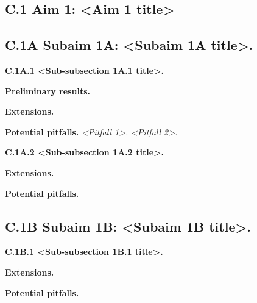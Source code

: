 
\subsection{C.1 Aim 1: <Aim 1 title>}\label{c.1-aim-1}

\lipsum[10]

\subsection{C.1A Subaim 1A: <Subaim 1A title>.}
\lipsum[11]

\textbf{C.1A.1 <Sub-subsection 1A.1 title>.}
\lipsum[12]


\textbf{Preliminary results.}

\textbf{Extensions.}

\textbf{Potential pitfalls.}
\emph{<Pitfall 1>.} %
\emph{<Pitfall 2>.} %

\textbf{C.1A.2 <Sub-subsection 1A.2 title>.}

\textbf{Extensions.}

\textbf{Potential pitfalls.}

\subsection{C.1B Subaim 1B: <Subaim 1B title>.}

\textbf{C.1B.1 <Sub-subsection 1B.1 title>.}

\textbf{Extensions.}

\textbf{Potential pitfalls.}
